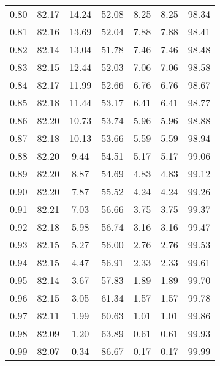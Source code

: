 \begin{tabular}{|c|c|c|c|c|c|c|}
      0.80 &     82.17 &     14.24 &      52.08 &    8.25 &       8.25 &         98.34 \\
      0.81 &     82.16 &     13.69 &      52.04 &    7.88 &       7.88 &         98.41 \\
      0.82 &     82.14 &     13.04 &      51.78 &    7.46 &       7.46 &         98.48 \\
      0.83 &     82.15 &     12.44 &      52.03 &    7.06 &       7.06 &         98.58 \\
      0.84 &     82.17 &     11.99 &      52.66 &    6.76 &       6.76 &         98.67 \\
      0.85 &     82.18 &     11.44 &      53.17 &    6.41 &       6.41 &         98.77 \\
      0.86 &     82.20 &     10.73 &      53.74 &    5.96 &       5.96 &         98.88 \\
      0.87 &     82.18 &     10.13 &      53.66 &    5.59 &       5.59 &         98.94 \\
      0.88 &     82.20 &      9.44 &      54.51 &    5.17 &       5.17 &         99.06 \\
      0.89 &     82.20 &      8.87 &      54.69 &    4.83 &       4.83 &         99.12 \\
      0.90 &     82.20 &      7.87 &      55.52 &    4.24 &       4.24 &         99.26 \\
      0.91 &     82.21 &      7.03 &      56.66 &    3.75 &       3.75 &         99.37 \\
      0.92 &     82.18 &      5.98 &      56.74 &    3.16 &       3.16 &         99.47 \\
      0.93 &     82.15 &      5.27 &      56.00 &    2.76 &       2.76 &         99.53 \\
      0.94 &     82.15 &      4.47 &      56.91 &    2.33 &       2.33 &         99.61 \\
      0.95 &     82.14 &      3.67 &      57.83 &    1.89 &       1.89 &         99.70 \\
      0.96 &     82.15 &      3.05 &      61.34 &    1.57 &       1.57 &         99.78 \\
      0.97 &     82.11 &      1.99 &      60.63 &    1.01 &       1.01 &         99.86 \\
      0.98 &     82.09 &      1.20 &      63.89 &    0.61 &       0.61 &         99.93 \\
      0.99 &     82.07 &      0.34 &      86.67 &    0.17 &       0.17 &         99.99 \\
\bottomrule
\end{tabular}
